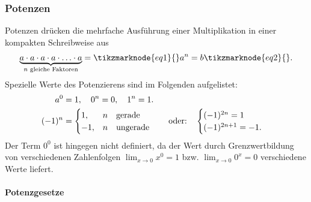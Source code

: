 \subsubsection{Potenzen}
Potenzen drücken die mehrfache Ausführung einer Multiplikation in einer kompakten Schreibweise aus
\begin{align}
    \underbrace{a \cdot a \cdot a \cdot a \cdot \hdots \cdot a}_{n \text{ gleiche Faktoren}} = \tikzmarknode{eq1}{}a^n = b\tikzmarknode{eq2}{}.
\end{align}
Spezielle Werte des Potenzierens sind im Folgenden aufgelistet: 
\begin{align}
    a^0 &= 1, \quad 0^n = 0, \quad 1^n = 1. \\
    (-1)^n &= \begin{cases}
        1, & n \qq{gerade} \\
        -1, & n \qq{ungerade}
    \end{cases} \qq{oder:} \begin{cases}
        (-1)^{2n} = 1 \\
        (-1)^{2n+1} = -1.
    \end{cases}
\end{align}
Der Term $0^0$ ist hingegen nicht definiert, da der Wert durch Grenzwertbildung von verschiedenen Zahlenfolgen $\lim_{x\to 0} x^0 = 1$ bzw. $\lim_{x\to 0} 0^x = 0$ verschiedene Werte liefert. 

\paragraph{Potenzgesetze}$~$

